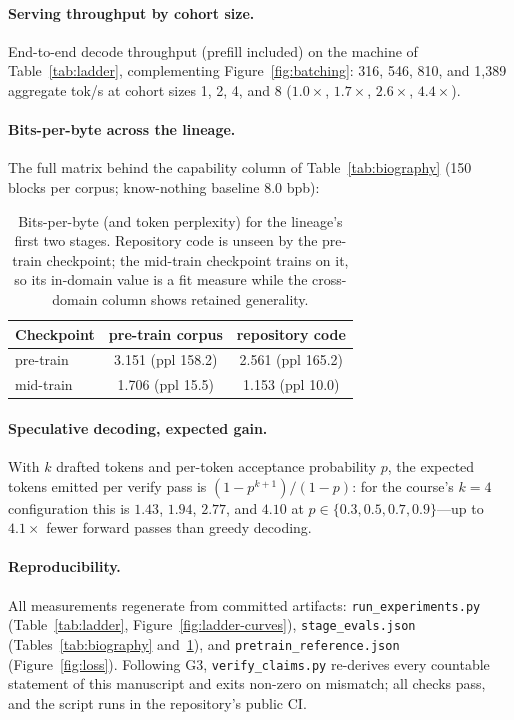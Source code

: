 \paragraph{Serving throughput by cohort size.} End-to-end decode throughput
(prefill included) on the machine of Table~\ref{tab:ladder}, complementing
Figure~\ref{fig:batching}: 316, 546, 810, and 1{,}389 aggregate tok/s at
cohort sizes 1, 2, 4, and 8 ($1.0\times$, $1.7\times$, $2.6\times$,
$4.4\times$).

\paragraph{Bits-per-byte across the lineage.} The full matrix behind the
capability column of Table~\ref{tab:biography} (150 blocks per corpus;
know-nothing baseline 8.0 bpb):

\begin{table}[h]
\centering
\small
\begin{tabular}{@{}lcc@{}}
\toprule
Checkpoint & pre-train corpus & repository code \\
\midrule
pre-train & 3.151 (ppl 158.2) & 2.561 (ppl 165.2) \\
mid-train & 1.706 (ppl 15.5) & 1.153 (ppl 10.0) \\
\bottomrule
\end{tabular}
\caption{Bits-per-byte (and token perplexity) for the lineage's first two
stages. Repository code is unseen by the pre-train checkpoint; the mid-train
checkpoint trains on it, so its in-domain value is a fit measure while the
cross-domain column shows retained generality.}
\label{tab:bpb}
\end{table}

\paragraph{Speculative decoding, expected gain.} With $k$ drafted tokens and
per-token acceptance probability $p$, the expected tokens emitted per verify
pass is $(1-p^{k+1})/(1-p)$: for the course's $k{=}4$ configuration this is
$1.43$, $1.94$, $2.77$, and $4.10$ at $p \in \{0.3, 0.5, 0.7, 0.9\}$---up to
$4.1\times$ fewer forward passes than greedy decoding.

\paragraph{Reproducibility.} All measurements regenerate from committed
artifacts: \texttt{run\_experiments.py} (Table~\ref{tab:ladder},
Figure~\ref{fig:ladder-curves}),
\texttt{stage\_evals.json} (Tables~\ref{tab:biography} and~\ref{tab:bpb}),
and \texttt{pretrain\_reference.json} (Figure~\ref{fig:loss}). Following G3,
\texttt{verify\_claims.py} re-derives every countable statement of this
manuscript and exits non-zero on mismatch; all checks pass, and the script
runs in the repository's public CI.
